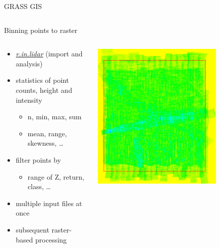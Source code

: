 \documentclass[xcolor={dvipsnames,usenames},beamer,aspectratio=169]{beamer}
\newcommand{\gmodule}[1]{\href{http://grass.osgeo.org/grass71/manuals/#1.html}{\emph{#1}}}
\begin{document}
\begin{frame}{GRASS GIS}
\begin{columns}
\begin{column}{0.55\textwidth}
\end{column}
\end{columns}

\end{frame}


\begin{frame}{Binning points to raster}

\begin{columns}
\begin{column}{0.4\textwidth}

 \begin{itemize}
  \item \gmodule{r.in.lidar} (import and analysis)
  \item statistics of point counts, height and intensity
  \begin{itemize}
    \item n, min, max, sum
    \item mean, range, skewness, \ldots
  \end{itemize}
  \item filter points by
  \begin{itemize}
    \item range of Z, return, class, \ldots
  \end{itemize}
  \item multiple input files at once
  \item subsequent raster-based processing
\end{itemize}

\end{column}
\begin{column}{0.45\textwidth}

\begin{center}
  \includegraphics[width=0.75\textwidth]{grass/rinlidar_region}
\end{center}

\end{column}
\end{columns}

\end{frame}
\end{document}
